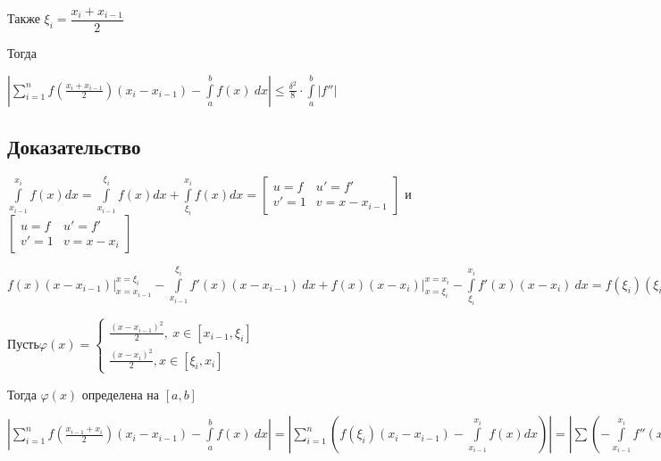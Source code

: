 \documentclass{article}
\begin{document}
			Также $\xi_i = \dfrac{x_i + x_{i - 1}}{2}$
			
			Тогда 

			$\left| \sum\limits^n_{i = 1} f \left( \frac{x_i + x_{i - 1}}{2} \right) (x_i - x_{i - 1}) - \int\limits^b_a f(x) \ dx \right| \leq \frac{\delta^2}{8} \cdot \int\limits^b_a |f''|$

		\subsection{Доказательство}

			$\int\limits^{x_i}_{x_{i - 1}} f(x) dx = \int\limits^{\xi_i}_{x_{i - 1}} f(x) dx + \int\limits^{x_i}_{\xi_i} f(x) dx = \begin{bmatrix} u = f & u' = f' \\ v' = 1 & v = x - x_{i - 1} \end{bmatrix}$ и $\begin{bmatrix} u = f & u' = f' \\ v' = 1 & v = x - x_i \end{bmatrix}$ 
				
			$f(x)(x - x_{i - 1}) \bigg|^{x = \xi_i}_{x = x_{i - 1}} - \int\limits^{\xi_i}_{x_{i - 1}} f'(x)(x - x_{i - 1}) \ dx + f(x)(x - x_i) \bigg|^{x = x_i}_{x = \xi_i} - \int\limits^{x_i}_{\xi_i} f'(x)(x - x_i) \ dx = f(\xi_i)(\xi_i - x_{i - 1}) + f(\xi_i)(x_i - \xi_i) - \left( f'(x) \frac{(x - x_{i - 1})^2}{2} \bigg|^{x = \xi_i}_{x = x_{i - 1}} - \int\limits^{\xi_i}_{x_{i -1 }} f''(x) \frac{(x - x_{i - 1})^2}{2} \ dx + f'(x) \frac{(x - x_i)^2}{2} \bigg|^{x_i}_{\xi_i} - \int\limits^{x_i}_{\xi_i} f''(x) \frac{(x - x_i)^2}{2} \right) = f(\xi_i)(x_i - x_{i - 1}) + \int\limits^{x_i}_{x_{i - 1}} f''(x) \ \varphi(x) \ dx$

			$Пусть \varphi(x) = \begin{cases} \frac{(x - x_{i - 1})^2}{2}, \ x \in [x_{i - 1}, \xi_i] \\ \frac{(x - x_i)^2}{2}, x \in [\xi_i, x_i] \end{cases}$
			
			Тогда $\varphi(x)$ определена на $[a, b]$

			$\left| \sum\limits^n_{i = 1} f \left(   \frac{x_{i - 1} + x_i}{2} \right) (x_i - x_{i - 1}) - \int\limits^b_a f(x) \ dx \right| = \left| \sum\limits^n_{i = 1} \left( f(\xi_i)(x_i - x_{i - 1}) - \int\limits^{x_i}_{x_{i - 1}} f(x) dx \right) \right| = \left| \sum \left( - \int\limits^{x_i}_{x_{i - 1}} f''(x) \varphi(x) \ dx \right) \right| = \left| \int\limits^b_a f''(x) \varphi(x) \ dx \right| \leq \int\limits^b_a | f''(x) | \varphi(x) \ dx \leq \frac{\delta^2}{8} \int\limits^b_a | f'' |$
\end{document}
